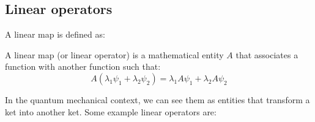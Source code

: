 \subsection{Linear operators}

A linear map is defined as:

\begin{definition} \label{linear_map}
    A linear map (or linear operator) is a mathematical entity $A$ that associates a function with another function such that:
    \begin{equation}
        A (\lambda_1\psi_1 + \lambda_2\psi_2) = \lambda_1 A\psi_1 + \lambda_2 A\psi_2
    \end{equation}
\end{definition}


In the quantum mechanical context, we can see them as entities that transform a ket into another ket. Some example linear operators are:
